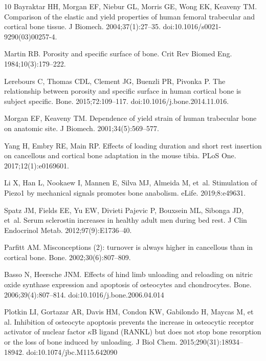 \documentclass[10pt,letterpaper]{article}
\begin{document}
\begin{thebibliography}{10}
Bayraktar HH, Morgan EF, Niebur GL, Morris GE, Wong EK, Keaveny TM.
\newblock Comparison of the elastic and yield properties of human femoral
  trabecular and cortical bone tissue.
\newblock J Biomech. 2004;37(1):27--35. doi:10.1016/s0021-9290(03)00257-4.

Martin RB.
\newblock Porosity and specific surface of bone.
\newblock Crit Rev Biomed Eng. 1984;10(3):179--222.

Lerebours C, Thomas CDL, Clement JG, Buenzli PR, Pivonka P.
\newblock The relationship between porosity and specific surface in human
  cortical bone is subject specific.
\newblock Bone. 2015;72:109--117. doi:10.1016/j.bone.2014.11.016.

Morgan EF, Keaveny TM.
\newblock Dependence of yield strain of human trabecular bone on anatomic site.
\newblock J Biomech. 2001;34(5):569--577.

Yang H, Embry RE, Main RP.
\newblock Effects of loading duration and short rest insertion on cancellous
  and cortical bone adaptation in the mouse tibia.
\newblock PLoS One. 2017;12(1):e0169601.

Li X, Han L, Nookaew I, Mannen E, Silva MJ, Almeida M, et~al.
\newblock Stimulation of Piezo1 by mechanical signals promotes bone anabolism.
\newblock eLife. 2019;8:e49631.

Spatz JM, Fields EE, Yu EW, Divieti Pajevic P, Bouxsein ML, Sibonga JD, et~al.
\newblock Serum sclerostin increases in healthy adult men during bed rest.
\newblock J Clin Endocrinol Metab. 2012;97(9):E1736--40.

Parfitt AM.
\newblock Misconceptions (2): turnover is always higher in cancellous than in
  cortical bone.
\newblock Bone. 2002;30(6):807--809.

Basso N, Heersche JNM.
\newblock Effects of hind limb unloading and reloading on nitric oxide synthase
  expression and apoptosis of osteocytes and chondrocytes.
\newblock Bone. 2006;39(4):807--814. doi:10.1016/j.bone.2006.04.014

Plotkin LI, Gortazar AR, Davis HM, Condon KW, Gabilondo H, Maycas M, et al.
\newblock Inhibition of osteocyte apoptosis prevents the increase in osteocytic
  receptor activator of nuclear factor $\kappa$B ligand (RANKL) but does not
  stop bone resorption or the loss of bone induced by unloading.
\newblock J Biol Chem. 2015;290(31):18934--18942. doi:10.1074/jbc.M115.642090


\end{thebibliography}
\end{document}
